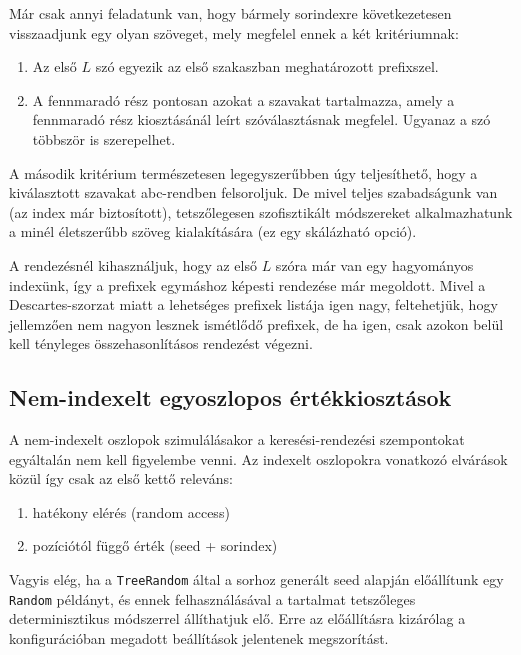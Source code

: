 \documentclass[
    parspace,
    noindent,
    nohyp,
]{elteiktdk}[2023/04/10]
\begin{document}
Már csak annyi feladatunk van, hogy bármely sorindexre következetesen visszaadjunk egy olyan szöveget,
mely megfelel ennek a két kritériumnak:

\begin{enumerate}
  \item Az első $L$ szó egyezik az első szakaszban meghatározott prefixszel.
  \item A fennmaradó rész pontosan azokat a szavakat tartalmazza,
        amely a fennmaradó rész kiosztásánál leírt szóválasztásnak megfelel.
        Ugyanaz a szó többször is szerepelhet.
\end{enumerate}

A második kritérium természetesen legegyszerűbben úgy teljesíthető,
hogy a kiválasztott szavakat abc-rendben felsoroljuk.
De mivel teljes szabadságunk van (az index már biztosított),
tetszőlegesen szofisztikált módszereket alkalmazhatunk a minél életszerűbb szöveg kialakítására
(ez egy skálázható opció).

A rendezésnél kihasználjuk, hogy az első $L$ szóra már van egy hagyományos indexünk,
így a prefixek egymáshoz képesti rendezése már megoldott.
Mivel a Descartes-szorzat miatt a lehetséges prefixek listája igen nagy,
feltehetjük, hogy jellemzően nem nagyon lesznek ismétlődő prefixek,
de ha igen, csak azokon belül kell tényleges összehasonlításos rendezést végezni.

\subsection{Nem-indexelt egyoszlopos értékkiosztások}

A nem-indexelt oszlopok szimulálásakor a keresési-rendezési szempontokat egyáltalán nem kell figyelembe venni.
Az indexelt oszlopokra vonatkozó elvárások közül így csak az első kettő releváns:

\begin{enumerate}
  \item hatékony elérés (random access)
  \item pozíciótól függő érték (seed + sorindex)
\end{enumerate}

Vagyis elég, ha a \texttt{TreeRandom} által a sorhoz generált seed alapján
előállítunk egy \texttt{Random} példányt,
és ennek felhasználásával a tartalmat tetszőleges determinisztikus módszerrel állíthatjuk elő.
Erre az előállításra kizárólag a konfigurációban megadott beállítások jelentenek megszorítást.
\end{document}
